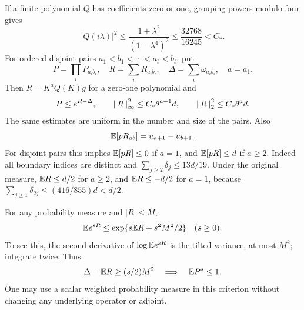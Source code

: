If a finite polynomial $Q$ has coefficients zero or one, grouping powers modulo four gives
\[
 |Q(i\lambda)|^2\le\frac{1+\lambda^2}{(1-\lambda^4)^2}
 \le\frac{32768}{16245}<C_*.
\]
For ordered disjoint pairs $a_1<b_1<\cdots<a_t<b_t$, put
\[
 P=\prod_{i}P_{a_ib_i},\quad R=\sum_iR_{a_ib_i},\quad
 \Delta=\sum_i\omega_{a_ib_i},\quad a=a_1.
\]
Then $R=K^aQ(K)g$ for a zero-one polynomial and
\begin{equation}\label{q3:eq:mask}
 P\le e^{R-\Delta},\qquad
 \left\lVert R\right\rVert_\infty^2\le C_*\theta^{a-1}d,\qquad
 \left\lVert R\right\rVert_2^2\le C_*\theta^ad.
\end{equation}
The same estimates are uniform in the number and size of the pairs. Also
\begin{equation}\label{q3:eq:weightedboundary}
 \mathbb E[pR_{ab}]=u_{a+1}-u_{b+1}.
\end{equation}
For disjoint pairs this implies $\mathbb E[pR]\le0$ if $a=1$, and $\mathbb E[pR]\le d$ if $a\ge2$. Indeed all boundary indices are distinct and $\sum_{j\ge2}\delta_{j}\le13d/19$. Under the original measure, $\mathbb E R\le d/2$ for $a\ge2$, and $\mathbb E R\le-d/2$ for $a=1$, because $\sum_{j\ge1}\delta_{2j}\le(416/855)d<d/2$.

For any probability measure and $|R|\le M$,
\begin{equation}\label{q3:eq:hoeffding}
 \mathbb E e^{sR}\le\exp\{s\mathbb E R+s^2M^2/2\}\quad(s\ge0).
\end{equation}
To see this, the second derivative of $\log\mathbb E e^{sR}$ is the tilted variance, at most $M^2$; integrate twice. Thus
\begin{equation}\label{q3:eq:criterion}
 \Delta-\mathbb E R\ge(s/2)M^2\quad\Longrightarrow\quad \mathbb E P^s\le1.
\end{equation}
One may use a scalar weighted probability measure in this criterion without changing any underlying operator or adjoint.

